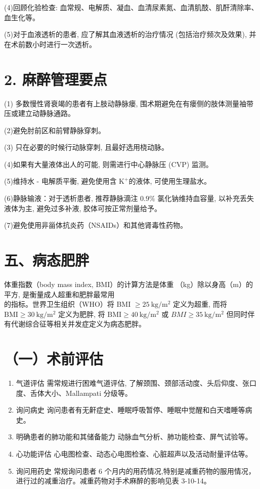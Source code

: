 \documentclass[10pt]{article}
\begin{document}
(4)回顾化验检查: 血常规、电解质、凝血、血清尿素氮、血清肌䣫、肌酐清除率、血生化等。

(5)对于血液透析的患者, 应了解其血液透析的治疗情况 (包括治疗频次及效果), 并在术前数小时进行一次透析。

\section*{2. 麻醉管理要点}
(1) 多数慢性肾衰竭的患者有上肢动静脉瘘, 围术期避免在有瘘侧的肢体测量袖带压或建立动静脉通路。

(2)避免肘前区和前臂静脉穿刺。

(3) 只在必要的时候行动脉穿刺, 且最好选用桡动脉。

(4)如果有大量液体出人的可能, 则需进行中心静脉压 (CVP) 监测。

(5)维持水 - 电解质平衡, 避免使用含 $\mathrm{K}^{+}$的液体, 可使用生理盐水。

(6)静脉输液：对于透析患者, 推荐静脉滴注 $0.9 \%$ 氯化钠维持血容量, 以补充丢失液体为主, 避免过多补液, 胶体可按正常剂量给予。

(7)避免使用非甾体抗炎药（NSAIDs）和其他肾毒性药物。

\section*{五、病态肥胖}
体重指数（body mass index, BMI）的计算方法是体重 （kg）除以身高（m）的平方, 是衡量成人超重和肥胖最常用\\
的指标。世界卫生组织（WHO）将 BMI $\geqslant 25 \mathrm{~kg} / \mathrm{m}^{2}$ 定义为超重, 而将 $\mathrm{BMI} \geqslant 30 \mathrm{~kg} / \mathrm{m}^{2}$ 定义为肥胖, 将 $\mathrm{BMI} \geqslant 40 \mathrm{~kg} / \mathrm{m}^{2}$ 或 $B M I \geqslant 35 \mathrm{~kg} / \mathrm{m}^{2}$ 但同时伴有代谢综合征等相关并发症定义为病态肥胖。

\section*{（一）术前评估}
\begin{enumerate}
  \item 气道评估 需常规进行困难气道评估, 了解颈围、颈部活动度、头后仰度、张口度、舌体大小、Mallampati 分级等。

  \item 询问病史 询问患者有无鼾症史、睡眠呼吸暂停、睡眠中觉醒和白天嗜睡等病史。

  \item 明确患者的肺功能和其储备能力 动脉血气分析、肺功能检查、屏气试验等。

  \item 心功能评估 心电图检查、动态心电图检查、心脏超声以及活动耐量评估等。

  \item 询问用药史 常规询问患者 6 个月内的用药情况,特别是减重药物的服用情况，进行过的减重治疗。减重药物对手术麻醉的影响见表 3-10-14。

\end{enumerate}
\end{document}
